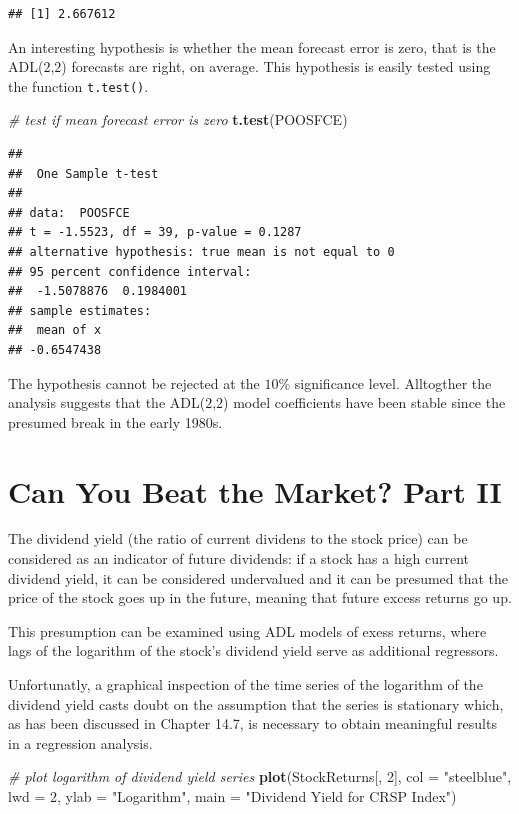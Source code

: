 \documentclass[]{book}
\newenvironment{Shaded}{\begin{snugshade}}{\end{snugshade}}
\newcommand{\KeywordTok}[1]{\textcolor[rgb]{0.13,0.29,0.53}{\textbf{#1}}}
\newcommand{\DataTypeTok}[1]{\textcolor[rgb]{0.13,0.29,0.53}{#1}}
\newcommand{\DecValTok}[1]{\textcolor[rgb]{0.00,0.00,0.81}{#1}}
\newcommand{\StringTok}[1]{\textcolor[rgb]{0.31,0.60,0.02}{#1}}
\newcommand{\CommentTok}[1]{\textcolor[rgb]{0.56,0.35,0.01}{\textit{#1}}}
\newcommand{\NormalTok}[1]{#1}
\theoremstyle{definition}
\theoremstyle{definition}
\theoremstyle{definition}
\theoremstyle{remark}
\begin{document}
\begin{verbatim}
## [1] 2.667612
\end{verbatim}

An interesting hypothesis is whether the mean forecast error is zero,
that is the ADL(\(2\),\(2\)) forecasts are right, on average. This
hypothesis is easily tested using the function \texttt{t.test()}.

\begin{Shaded}
\begin{Highlighting}[]
\CommentTok{# test if mean forecast error is zero}
\KeywordTok{t.test}\NormalTok{(POOSFCE)}
\end{Highlighting}
\end{Shaded}

\begin{verbatim}
## 
##  One Sample t-test
## 
## data:  POOSFCE
## t = -1.5523, df = 39, p-value = 0.1287
## alternative hypothesis: true mean is not equal to 0
## 95 percent confidence interval:
##  -1.5078876  0.1984001
## sample estimates:
##  mean of x 
## -0.6547438
\end{verbatim}

The hypothesis cannot be rejected at the \(10\%\) significance level.
Alltogther the analysis suggests that the ADL(\(2\),\(2\)) model
coefficients have been stable since the presumed break in the early
1980s.

\section{Can You Beat the Market? Part
II}\label{can-you-beat-the-market-part-ii}

The dividend yield (the ratio of current dividens to the stock price)
can be considered as an indicator of future dividends: if a stock has a
high current dividend yield, it can be considered undervalued and it can
be presumed that the price of the stock goes up in the future, meaning
that future excess returns go up.

This presumption can be examined using ADL models of exess returns,
where lags of the logarithm of the stock's dividend yield serve as
additional regressors.

Unfortunatly, a graphical inspection of the time series of the logarithm
of the dividend yield casts doubt on the assumption that the series is
stationary which, as has been discussed in Chapter 14.7, is necessary to
obtain meaningful results in a regression analysis.

\begin{Shaded}
\begin{Highlighting}[]
\CommentTok{# plot logarithm of dividend yield series}
\KeywordTok{plot}\NormalTok{(StockReturns[, }\DecValTok{2}\NormalTok{], }
     \DataTypeTok{col =} \StringTok{"steelblue"}\NormalTok{, }
     \DataTypeTok{lwd =} \DecValTok{2}\NormalTok{, }
     \DataTypeTok{ylab =} \StringTok{"Logarithm"}\NormalTok{, }
     \DataTypeTok{main =} \StringTok{"Dividend Yield for CRSP Index"}\NormalTok{)}
\end{Highlighting}
\end{Shaded}
\end{document}
